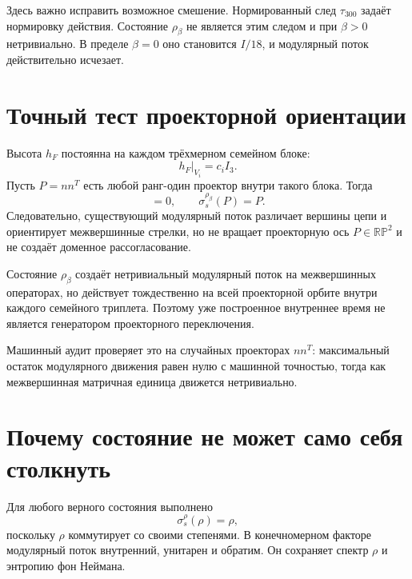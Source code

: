 Здесь важно исправить возможное смешение. Нормированный след
$\tau_{300}$ задаёт нормировку действия. Состояние $\rho_\beta$ не является
этим следом и при $\beta>0$ нетривиально. В пределе $\beta=0$ оно становится
$I/18$, и модулярный поток действительно исчезает.

\section{Точный тест проекторной ориентации}

Высота $h_F$ постоянна на каждом трёхмерном семейном блоке:
\begin{equation}
 h_F\big|_{V_i}=c_i I_3.
\end{equation}
Пусть $P=nn^T$ есть любой ранг-один проектор внутри такого блока. Тогда
\begin{equation}
 [h_F,P]=0,
 \qquad
 \sigma_s^{\rho_\beta}(P)=P.
 \label{eq:v6-modular-flow-fixes-projective-axis}
\end{equation}
Следовательно, существующий модулярный поток различает вершины цепи и
ориентирует межвершинные стрелки, но не вращает проекторную ось
$P\in\mathbb{RP}^2$ и не создаёт доменное рассогласование.

\begin{theorem}
Состояние $\rho_\beta$ создаёт нетривиальный модулярный поток на
межвершинных операторах, но действует тождественно на всей проекторной
орбите внутри каждого семейного триплета. Поэтому уже построенное внутреннее
время не является генератором проекторного переключения.
\end{theorem}

Машинный аудит проверяет это на случайных проекторах $nn^T$: максимальный
остаток модулярного движения равен нулю с машинной точностью, тогда как
межвершинная матричная единица движется нетривиально.

\section{Почему состояние не может само себя столкнуть}

Для любого верного состояния выполнено
\begin{equation}
 \sigma_s^\rho(\rho)=\rho,
\end{equation}
поскольку $\rho$ коммутирует со своими степенями. В конечномерном факторе
модулярный поток внутренний, унитарен и обратим. Он сохраняет спектр
$\rho$ и энтропию фон Неймана.

